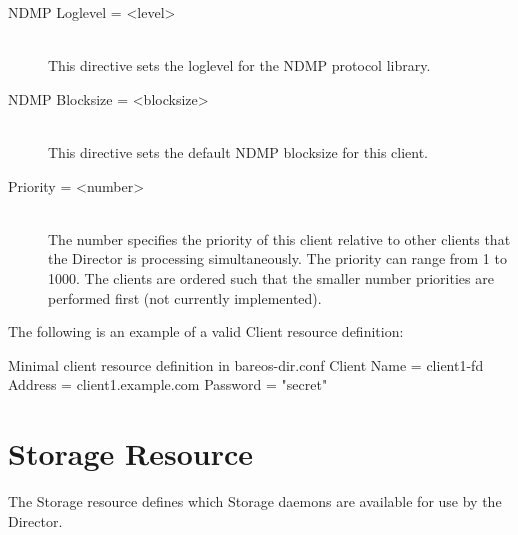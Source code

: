 \begin{description}
\item [NDMP Loglevel = {\textless}level{\textgreater}] \hfill \\
This directive sets the loglevel for the NDMP protocol library.

\item [NDMP Blocksize = {\textless}blocksize{\textgreater}] \hfill \\
This directive sets the default NDMP blocksize for this client.


\item [Priority = {\textless}number{\textgreater}] \hfill \\
The number specifies the  priority of this client relative to other clients
that the  Director is processing simultaneously. The priority can range  from
1 to 1000. The clients are ordered such that the smaller  number priorities
are performed first (not currently  implemented).

\end{description}

The following is an example of a valid Client resource definition:

\begin{bconfig}{Minimal client resource definition in bareos-dir.conf}
Client {
  Name = client1-fd
  Address = client1.example.com
  Password = "secret"
}
\end{bconfig}

\section{Storage Resource}
\label{DirectorResourceStorage}

The Storage resource defines which Storage daemons are available for use by
the Director.

